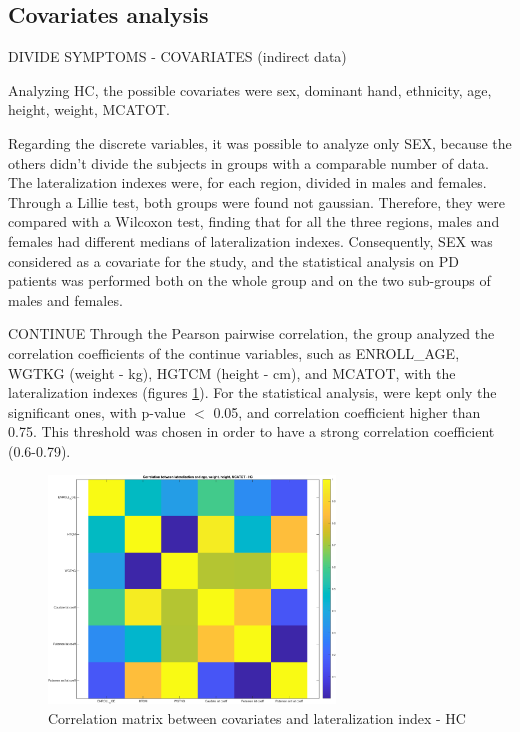 \documentclass[]{article}
\begin{document}
\begin{multicols}{2}
\subsection{Covariates analysis}

DIVIDE SYMPTOMS - COVARIATES (indirect data)

Analyzing HC, the possible covariates were sex, dominant hand, ethnicity, age, height, weight, MCATOT.

Regarding the discrete variables, it was possible to analyze only SEX, because the others didn't divide the subjects in groups with a comparable number of data. 
The lateralization indexes were, for each region, divided in males and females. Through a Lillie test, both groups were found not gaussian. Therefore, they were compared with a Wilcoxon test, finding that for all the three regions, males and females had different medians of lateralization indexes.
Consequently, SEX was considered as a covariate for the study, and the statistical analysis on PD patients was performed both on the whole group and on the two sub-groups of males and females.

CONTINUE
Through the Pearson pairwise correlation, the group analyzed the correlation coefficients of the continue variables, such as ENROLL\_AGE, WGTKG (weight - kg), HGTCM (height - cm), and MCATOT, with the lateralization indexes (figures \ref{fig:cov_mat_hc}). For the statistical analysis, were kept only the significant ones, with p-value $<$ 0.05, and correlation coefficient higher than 0.75. This threshold was chosen in order to have a strong correlation coefficient (0.6-0.79). 

\end{multicols}


\begin{figure}[h]
	\centering
	\includegraphics[width=3in]{../covariates_mat_hc}
	\caption{Correlation matrix between covariates and lateralization index - HC}
	\label{fig:cov_mat_hc}
	
\end{figure} 
 
\end{document}

